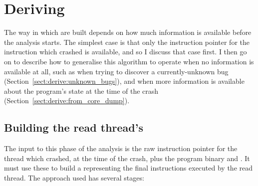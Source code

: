 \section{Deriving \StateMachines}
\label{sect:derive:derive}


The way in which {\StateMachines} are built depends on how much
information is available before the analysis starts.  The simplest
case is that only the instruction pointer for the instruction which
crashed is available, and so I discuss that case first.  I then go on
to describe how to generalise this algorithm to operate when no
information is available at all, such as when trying to discover a
currently-unknown bug (Section~\ref{sect:derive:unknown_bugs}), and
when more information is available about the program's state at the
time of the crash (Section~\ref{sect:derive:from_core_dump}).


\subsection{Building the read thread's \StateMachine}

The input to this phase of the analysis is the raw instruction pointer
for the thread which crashed, at the time of the crash, plus the
program binary and .  It must use these to
build a {\StateMachine} representing the final \backref{$\alpha$}
instructions executed by the read thread.  The approach used has
several stages:

